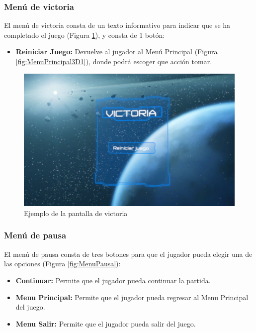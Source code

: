 \subsubsection{Menú de victoria}
El menú de victoria consta de un texto informativo para indicar que se ha completado el juego (Figura \ref{fig:MenuVictoria3D}), y consta de 1 botón:
\begin{itemize}
	\item \textbf{Reiniciar Juego:} Devuelve al jugador al Menú Principal (Figura \ref{fig:MenuPrincipal3D1}), donde podrá escoger que acción tomar.
\end{itemize}

\begin{figure}[H]
	\centering
	\includegraphics[scale=0.85]{imagenes/MenuVictoria3D.png}
	\caption{\label{fig:MenuVictoria3D}Ejemplo de la pantalla de victoria}
\end{figure}

\subsubsection{Menú de pausa}
El menú de pausa consta de tres botones para que el jugador pueda elegir una de las opciones (Figura \ref{fig:MenuPausa}):
\begin{itemize}
	\item \textbf{Continuar:} Permite que el jugador pueda continuar la partida.
	\item \textbf{Menu Principal:} Permite que el jugador pueda regresar al Menu Principal del juego.
	\item \textbf{Menu Salir:} Permite que el jugador pueda salir del juego.
\end{itemize}


